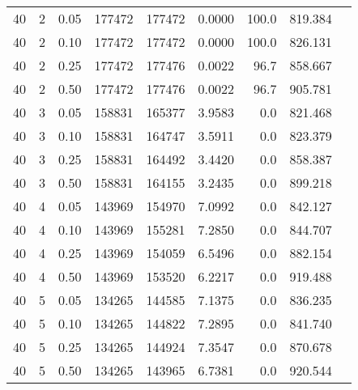 \begin{table}
\begin{center}
\begin{tabular}{|c|c|c|r|r|c|r|r|r|}
40 & 2 & 0.05 & 177472 & 177472 & 0.0000 & 100.0 & 819.384 \\
40 & 2 & 0.10 & 177472 & 177472 & 0.0000 & 100.0 & 826.131 \\
40 & 2 & 0.25 & 177472 & 177476 & 0.0022 & 96.7 & 858.667 \\
40 & 2 & 0.50 & 177472 & 177476 & 0.0022 & 96.7 & 905.781 \\
40 & 3 & 0.05 & 158831 & 165377 & 3.9583 & 0.0 & 821.468 \\
40 & 3 & 0.10 & 158831 & 164747 & 3.5911 & 0.0 & 823.379 \\
40 & 3 & 0.25 & 158831 & 164492 & 3.4420 & 0.0 & 858.387 \\
40 & 3 & 0.50 & 158831 & 164155 & 3.2435 & 0.0 & 899.218 \\
40 & 4 & 0.05 & 143969 & 154970 & 7.0992 & 0.0 & 842.127 \\
40 & 4 & 0.10 & 143969 & 155281 & 7.2850 & 0.0 & 844.707 \\
40 & 4 & 0.25 & 143969 & 154059 & 6.5496 & 0.0 & 882.154 \\
40 & 4 & 0.50 & 143969 & 153520 & 6.2217 & 0.0 & 919.488 \\
40 & 5 & 0.05 & 134265 & 144585 & 7.1375 & 0.0 & 836.235 \\
40 & 5 & 0.10 & 134265 & 144822 & 7.2895 & 0.0 & 841.740 \\
40 & 5 & 0.25 & 134265 & 144924 & 7.3547 & 0.0 & 870.678 \\
40 & 5 & 0.50 & 134265 & 143965 & 6.7381 & 0.0 & 920.544 \\
\hline
\end{tabular}
\end{center}
\end{table}
